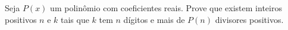 Seja $P(x)$ um polinômio com coeficientes reais.
Prove que existem inteiros positivos $n$ e $k$ tais que $k$ tem $n$ dígitos e mais de $P(n)$ divisores positivos.